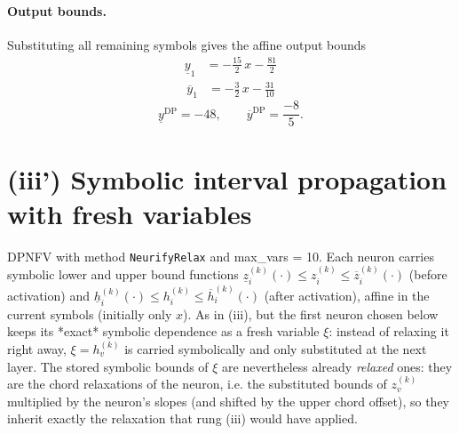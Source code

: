 \documentclass[11pt]{article}
\begin{document}
\paragraph{Output bounds.}
Substituting all remaining symbols gives the affine output bounds
\begin{align*}
\underline{y}_{1} &= -\frac{15}{2}\,x - \frac{81}{2}
\end{align*}
\begin{align*}
\overline{y}_{1} &= -\frac{3}{2}\,x - \frac{31}{10}
\end{align*}
\begin{equation*}
\underline{y}^{\text{DP}} = -48, \qquad \overline{y}^{\text{DP}} = \frac{-8}{5}.
\end{equation*}

\section{(iii') Symbolic interval propagation with fresh variables}
DPNFV with method \texttt{NeurifyRelax} and max\_vars = 10. Each neuron carries symbolic lower and upper bound functions
$\underline{z}^{(k)}_i(\cdot) \le z^{(k)}_i \le \overline{z}^{(k)}_i(\cdot)$ (before activation)
and $\underline{h}^{(k)}_i(\cdot) \le h^{(k)}_i \le \overline{h}^{(k)}_i(\cdot)$ (after activation),
affine in the current symbols (initially only $x$).
As in (iii), but the first neuron chosen below keeps its *exact*
symbolic dependence as a fresh variable $\xi$: instead of relaxing it right away, $\xi = h^{(k)}_v$
is carried symbolically and only substituted at the next layer. The stored symbolic bounds of $\xi$
are nevertheless already \emph{relaxed} ones: they are the chord relaxations of the neuron, i.e.
the substituted bounds of $z^{(k)}_v$ multiplied by the neuron's slopes (and shifted by the upper
chord offset), so they inherit exactly the relaxation that rung (iii) would have applied.
\end{document}
